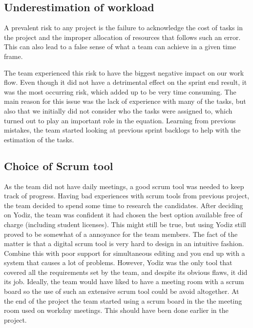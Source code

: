 
\subsection{Underestimation of workload}
A prevalent risk to any project is the failure to acknowledge the cost of tasks in the project and the improper allocation of resources that follows such an error. This can also lead to a false sense of what a team can achieve in a given time frame. 

The team experienced this risk to have the biggest negative impact on our work flow. Even though it did not have a detrimental effect on the sprint end result, it was the most occurring risk, which added up to be very time consuming. The main reason for this issue was the lack of experience with many of the tasks, but also that we initially did not consider who the tasks were assigned to, which turned out to play an important role in the equation. Learning from previous mistakes, the team started looking at previous sprint backlogs to help with the estimation of the tasks.

\subsection{Choice of Scrum tool}
\label{sec:choiceScrumTool}
As the team did not have daily meetings, a good scrum tool was needed to keep track of progress. Having bad experiences with scrum tools from previous project, the team decided to spend some time to research the candidates. After deciding on Yodiz, the team was confident it had chosen the best option available free of charge (including student licenses). This might still be true, but using Yodiz still proved to be somewhat of a annoyance for the team members. The fact of the matter is that a digital scrum tool is very hard to design in an intuitive fashion. Combine this with poor support for simultaneous editing and you end up with a system that causes a lot of problems. However, Yodiz was the only tool that covered all the requirements set by the team, and despite its obvious flaws, it did its job. Ideally, the team would have liked to have a meeting room with a scrum board so the use of such an extensive scrum tool could be avoid altogether. At the end of the project the team started using a scrum board in the the meeting room used on workday meetings. This should have been done earlier in the project.

